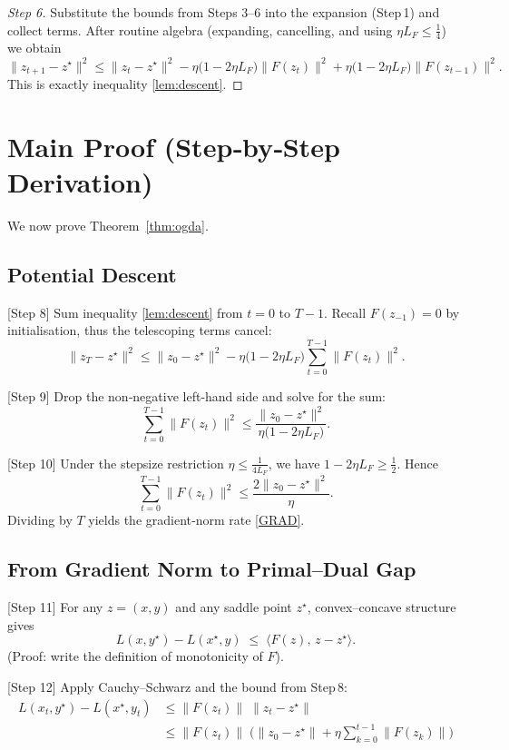 \documentclass{article}
\begin{document}
\begin{proof}
[Step 6] Substitute the bounds from Steps 3–6 into the expansion (Step 1) and collect terms.
After routine algebra (expanding, cancelling, and using $\eta L_{F}\le\frac14$) we obtain
\[
\|z_{t+1}-z^{\star}\|^{2}
\le
\|z_{t}-z^{\star}\|^{2}
- \eta\bigl(1-2\eta L_{F}\bigr)\|F(z_{t})\|^{2}
+\eta\bigl(1-2\eta L_{F}\bigr)\|F(z_{t-1})\|^{2}.
\tag{Step 7}
\]
This is exactly inequality \eqref{lem:descent}.
\end{proof}

\section*{Main Proof (Step‑by‑Step Derivation)}
We now prove Theorem~\ref{thm:ogda}.

\subsection*{Potential Descent}
[Step 8] Sum inequality \eqref{lem:descent} from $t=0$ to $T-1$.
Recall $F(z_{-1})=0$ by initialisation, thus the telescoping terms cancel:
\[
\|z_{T}-z^{\star}\|^{2}
\le
\|z_{0}-z^{\star}\|^{2}
- \eta\bigl(1-2\eta L_{F}\bigr)\sum_{t=0}^{T-1}\|F(z_{t})\|^{2}.
\tag{Step 8}
\]

[Step 9] Drop the non‑negative left‑hand side and solve for the sum:
\[
\sum_{t=0}^{T-1}\|F(z_{t})\|^{2}
\le
\frac{\|z_{0}-z^{\star}\|^{2}}{\eta\bigl(1-2\eta L_{F}\bigr)}.
\tag{Step 9}
\]

[Step 10] Under the stepsize restriction $\eta\le \frac{1}{4L_{F}}$, we have $1-2\eta L_{F}\ge\frac12$. Hence
\[
\sum_{t=0}^{T-1}\|F(z_{t})\|^{2}
\le
\frac{2\|z_{0}-z^{\star}\|^{2}}{\eta }.
\tag{Step 10}
\]
Dividing by $T$ yields the gradient‑norm rate \eqref{GRAD}.

\subsection*{From Gradient Norm to Primal–Dual Gap}
[Step 11] For any $z=(x,y)$ and any saddle point $z^{\star}$, convex–concave structure gives
\[
L(x,y^{\star})-L(x^{\star},y)
\;\le\;
\langle F(z),\,z-z^{\star}\rangle .
\tag{Step 11}
\]
(Proof: write the definition of monotonicity of $F$).

[Step 12] Apply Cauchy–Schwarz and the bound from Step 8:
\[
\begin{aligned}
L(x_{t},y^{\star})-L(x^{\star},y_{t})
&\le \|F(z_{t})\|\;\|z_{t}-z^{\star}\|\\
&\le \|F(z_{t})\|\;\bigl(\|z_{0}-z^{\star}\|+\eta\sum_{k=0}^{t-1}\|F(z_{k})\|\bigr)
\end{aligned}
\tag{Step 12}
\]
\end{document}
